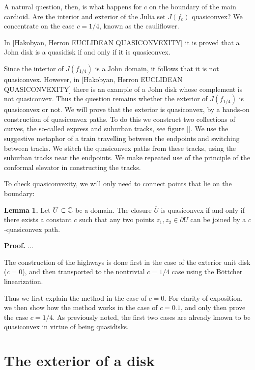 \documentclass[hebrew,english]{article}
\begin{document}
A natural question, then, is what happens for $c$ on the boundary
of the main cardioid. Are the interior and exterior of the Julia set
$J(f_{c})$ quasiconvex? We concentrate on the case $c=1/4$, known
as the cauliflower.

In {[}Hakobyan, Herron EUCLIDEAN QUASICONVEXITY{]} it is proved that
a John disk is a quasidisk if and only if it is quasiconvex. 

Since the interior of $J(f_{1/4})$ is a John domain, it follows that
it is not quasiconvex. However, in {[}Hakobyan, Herron EUCLIDEAN QUASICONVEXITY{]}
there is an example of a John disk whose complement is not quasiconvex.
Thus the question remains whether the exterior of $J(f_{1/4})$ is
quasiconvex or not. We will prove that the exterior is quasiconvex,
by a hands-on construction of quasiconvex paths. To do this we construct
two collections of curves, the so-called \textquotedbl express\textquotedbl{}
and \textquotedbl suburban\textquotedbl{} tracks, see figure {[}{]}.
We use the suggestive metaphor of a train travelling between the endpoints
and switching between tracks. We stitch the quasiconvex paths from
these tracks, using the suburban tracks near the endpoints. We make
repeated use of the principle of the conformal elevator in constructing
the tracks.

To check quasiconvexity, we will only need to connect points that
lie on the boundary:

\textbf{Lemma 1. }Let $U\subset\mathbb{C}$ be a domain. The closure $\overline{U}$
is quasiconvex if and only if there exists a constant $c$ such that
any two points $z_{1},z_{2}\in\partial U$ can be joined by a $c$-quasiconvex
path.

\textbf{Proof.} ...

The construction of the highways is done first in the case of the
exterior unit disk ($c=0$), and then transported to the nontrivial
$c=1/4$ case using the Böttcher linearization. 

Thus we first explain the method in the case of $c=0$. For clarity
of exposition, we then show how the method works in the case of $c=0.1$,
and only then prove the case $c=1/4$. As previously noted, the first
two cases are already known to be quasiconvex in virtue of being quasidisks.


\subsection{}

\section{The exterior of a disk}
\end{document}
